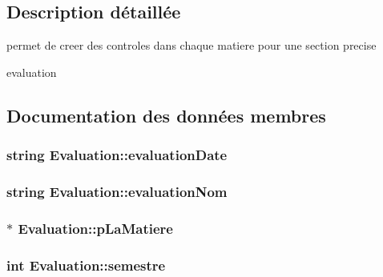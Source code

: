 \subsection{Description détaillée}
permet de creer des controles dans chaque matiere pour une section precise 

evaluation 

\subsection{Documentation des données membres}
\hypertarget{class_evaluation_ab9db02e7354335d10cf64c0b6d1e730f}{
\subsubsection[{evaluation\+Date}]{\setlength{\rightskip}{0pt plus 5cm}string Evaluation\+::evaluation\+Date\hspace{0.3cm}{\ttfamily [private]}}}\label{class_evaluation_ab9db02e7354335d10cf64c0b6d1e730f}
\hypertarget{class_evaluation_aaa4db227004bf8c359d863f6e1dbbefd}{
\subsubsection[{evaluation\+Nom}]{\setlength{\rightskip}{0pt plus 5cm}string Evaluation\+::evaluation\+Nom\hspace{0.3cm}{\ttfamily [private]}}}\label{class_evaluation_aaa4db227004bf8c359d863f6e1dbbefd}
\hypertarget{class_evaluation_ad5f4d301c80076389e2ea31dfd7f09b1}{
\subsubsection[{p\+La\+Matiere}]{$\ast$ Evaluation\+::p\+La\+Matiere\hspace{0.3cm}{\ttfamily [private]}}}\label{class_evaluation_ad5f4d301c80076389e2ea31dfd7f09b1}
\hypertarget{class_evaluation_ae000ec143562ed56975018bf82b13b5c}{
\subsubsection[{semestre}]{\setlength{\rightskip}{0pt plus 5cm}int Evaluation\+::semestre\hspace{0.3cm}{\ttfamily [private]}}}\label{class_evaluation_ae000ec143562ed56975018bf82b13b5c}
